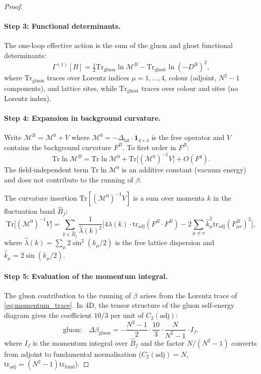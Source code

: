 \documentclass[11pt,a4paper]{amsart}
\theoremstyle{definition}
\newcommand{\tr}{\mathrm{tr}}
\newcommand{\Tr}{\mathrm{Tr}}
\begin{document}
\begin{proof}
\paragraph{Step 3: Functional determinants.}
The one-loop effective action is the sum of the gluon and ghost
functional determinants:
\begin{equation}\label{eq:Gamma1}
  \Gamma^{(1)}[B] = \tfrac{1}{2}\Tr_{\mathrm{gluon}}\ln\mathcal{M}^B
  - \Tr_{\mathrm{ghost}}\ln(-D^B)^2,
\end{equation}
where $\Tr_{\mathrm{gluon}}$ traces over Lorentz indices $\mu=1,\ldots,4$,
colour (adjoint, $N^2-1$ components), and lattice sites, while
$\Tr_{\mathrm{ghost}}$ traces over colour and sites (no Lorentz index).

\paragraph{Step 4: Expansion in background curvature.}
Write $\mathcal{M}^B = \mathcal{M}^0 + V$ where $\mathcal{M}^0 = -\Delta_{\mathrm{lat}}\cdot\mathbf{1}_{4\times 4}$
is the free operator and $V$ contains the background curvature $F^B$.
To first order in $F^B$:
\begin{equation}\label{eq:trace_expand}
  \Tr\ln\mathcal{M}^B = \Tr\ln\mathcal{M}^0
  + \Tr\bigl[(\mathcal{M}^0)^{-1} V\bigr] + O(F^4).
\end{equation}
The field-independent term $\Tr\ln\mathcal{M}^0$ is an additive constant
(vacuum energy) and does not contribute to the running of $\beta$.

The curvature insertion $\Tr[(\mathcal{M}^0)^{-1}V]$ is a sum over
momenta $k$ in the fluctuation band $\hat{B}_f$:
\begin{equation}\label{eq:momentum_trace}
  \Tr\bigl[(\mathcal{M}^0)^{-1} V\bigr]
  = \sum_{k\in\hat{B}_f}\frac{1}{\hat\lambda(k)^2}
    \bigl[4\hat\lambda(k)\cdot\tr_{\mathrm{adj}}(F^B\cdot F^B)
    - 2\sum_{\mu\neq\nu}\hat k_\mu^2 \tr_{\mathrm{adj}}(F^B_{\mu\nu})^2\bigr],
\end{equation}
where $\hat\lambda(k) = \sum_\mu 2\sin^2(k_\mu/2)$ is the free lattice
dispersion and $\hat k_\mu = 2\sin(k_\mu/2)$.

\paragraph{Step 5: Evaluation of the momentum integral.}
The gluon contribution to the running of $\beta$ arises from the
Lorentz trace of \eqref{eq:momentum_trace}.  In 4D, the tensor
structure of the gluon self-energy diagram gives the coefficient
$10/3$ per unit of $C_2(\mathrm{adj})$:
\[
  \text{gluon:}\quad \Delta\beta_{\mathrm{gluon}}
  = -\frac{N^2-1}{2}\cdot\frac{10}{3}\cdot\frac{N}{N^2-1}\cdot I_f,
\]
where $I_f$ is the momentum integral over $\hat{B}_f$ and the
factor $N/(N^2-1)$ converts from adjoint to fundamental normalisation
($C_2(\mathrm{adj}) = N$, $\tr_{\mathrm{adj}} = (N^2-1)\tr_{\mathrm{fund}}$).


\end{proof}
\end{document}
